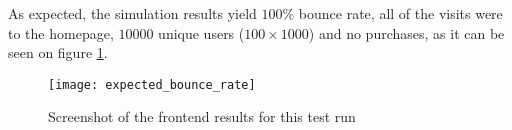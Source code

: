 As expected, the simulation results yield $100\%$ bounce rate, all of the 
visits were to the homepage, $10000$ unique users ($100 \times 1000$) and no 
purchases, as it can be seen on figure \ref{fig:test3result}.

\begin{figure}[h]
    \begin{center}
        \leavevmode
        \texttt{[image: expected\_bounce\_rate]}
        \caption{Screenshot of the frontend results for this test run}
        \label{fig:test3result}
    \end{center}
\end{figure}





